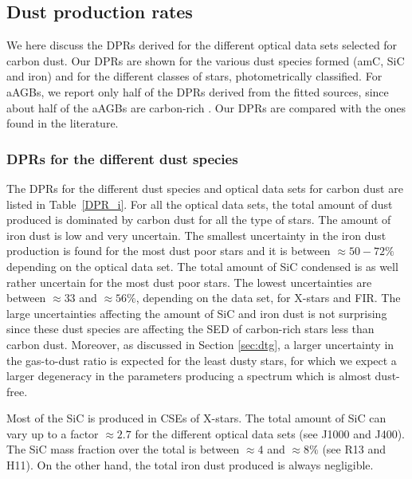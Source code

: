 \documentclass[useAMS,usenatbib]{mn2e/mn2e}
\begin{document}
{\subsection{Dust production rates}
We here discuss the DPRs derived for the different optical data sets selected for carbon dust.
Our DPRs are shown for the various dust species formed (amC, SiC and iron) and for the different classes of stars, photometrically classified. 
For aAGBs, we report only half of the DPRs derived from the fitted sources, since about half of the aAGBs are carbon-rich \citep{Boyer15}.
Our DPRs are compared with the ones found in the literature.
\subsubsection{DPRs for the different dust species}
The DPRs for the different dust species and optical data sets for carbon dust are listed in Table~\ref{DPR_i}. 
For all the optical data sets, the total amount of dust produced is dominated by carbon dust for all the type of stars. 
The amount of iron dust is low and very uncertain. The smallest uncertainty in the iron dust production is found for the most dust poor stars and it is between $\approx50-72\%$ depending on the optical data set.
The total amount of SiC condensed is as well rather uncertain for the most dust poor stars. The lowest uncertainties are between $\approx33$ and $\approx56\%$, depending on the data set, for X-stars and FIR.
The large uncertainties affecting the amount of SiC and iron dust is not surprising since these dust species are affecting the SED of carbon-rich stars less than carbon dust. 
Moreover, as discussed in Section \ref{sec:dtg}, a larger uncertainty in the gas-to-dust ratio is expected for the least dusty stars, for which we expect a larger degeneracy in the parameters producing a spectrum which is almost dust-free.

Most of the SiC is produced in CSEs of X-stars. The total amount of SiC can vary up to a factor $\approx 2.7$ for the different optical data sets (see J1000 and J400). The SiC mass fraction over the total is between $\approx 4$ and $\approx8\%$ (see R13 and H11).
On the other hand, the total iron dust produced is always negligible.

}
\end{document}
